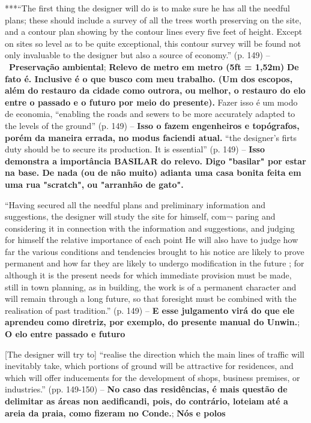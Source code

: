 \documentclass[12pt, a4paper]{book} %
\begin{document}
        ***``The first thing the designer will do is to make sure he has all the needful plans; these should include a survey of all the trees worth preserving on the site, and a contour plan showing by the contour lines every five feet of height. Except on sites so level as to be quite exceptional, this contour survey will be found not only invaluable to the designer but also a source of economy.'' (p. 149) – \textbf{Preservação ambiental}; \textbf{Relevo de metro em metro (5ft = 1,52m)} \textbf{De fato é. Inclusive é o que busco com meu trabalho. (Um dos escopos, além do restauro da cidade como outrora, ou melhor, o restauro do elo entre o passado e o futuro por meio do presente).}
        Fazer isso é um modo de economia, ``enabling the roads and sewers to be more accurately adapted to the levels of the ground'' (p. 149) – \textbf{Isso o fazem engenheiros e topógrafos, porém da maneira errada, no modus faciendi atual.}
        ``the designer's firts duty should be to secure its production. It is essential'' (p. 149) – \textbf{Isso demonstra a importância BASILAR do relevo. Digo "basilar" por estar na base. De nada (ou de não muito) adianta uma casa bonita feita em uma rua "scratch", ou "arranhão de gato".}

        ``Having secured all the needful plans and preliminary information and suggestions, the designer will study the site for himself, com¬ paring and considering it in connection with the information and suggestions, and judging for himself the relative importance of each point He will also have to judge how far the various conditions and tendencies brought to his notice are likely to prove permanent and how far they are likely to undergo modification in the future ; for although it is the present needs for which immediate provision must be made, still in town planning, as in building, the work is of a permanent character and will remain through a long future, so that foresight must be combined with the realisation of past tradition.'' (p. 149) – \textbf{E esse julgamento virá do que ele aprendeu como diretriz, por exemplo, do presente manual do Unwin.}; \textbf{O elo entre passado e futuro}

        [The designer will try to] ``realise the direction which the main lines of traffic will inevitably take, which portions of ground will be attractive for residences, and which will offer inducements for the development of shops, business premises, or industries.'' (pp. 149-150) – \textbf{No caso das residências, é mais questão de delimitar as áreas non aedificandi, pois, do contrário, loteiam até a areia da praia, como fizeram no Conde.}; \textbf{Nós e polos}
\end{document}
